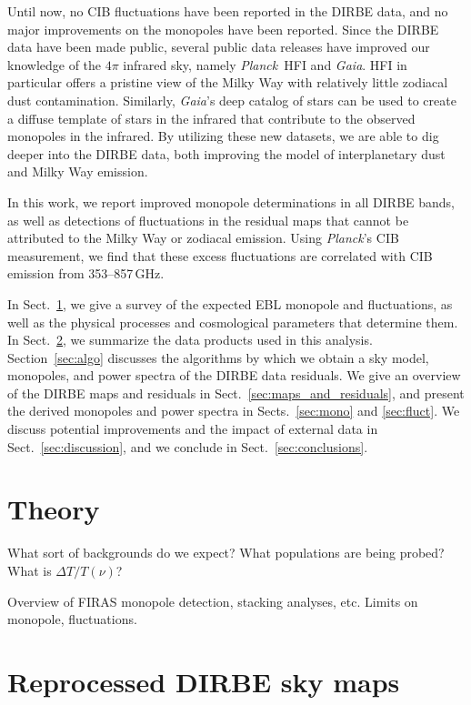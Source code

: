 \documentclass{aa}
\def\Planck{\textit{Planck}}
\begin{document}
Until now, no CIB fluctuations have been reported in the DIRBE data, and no major improvements on the monopoles have been reported. Since the DIRBE data have been made public, several public data releases have improved our knowledge of the $4\pi$ infrared sky, namely \Planck\ HFI and \textit{Gaia}. HFI in particular offers a pristine view of the Milky Way with relatively little zodiacal dust contamination. Similarly, \textit{Gaia}'s deep catalog of stars can be used to create a diffuse template of stars in the infrared that contribute to the observed monopoles in the infrared. By utilizing these new datasets, we are able to dig deeper into the DIRBE data, both improving the model of interplanetary dust and Milky Way emission.

In this work, we report improved monopole determinations in all DIRBE bands, as well as detections of fluctuations in the residual maps that cannot be attributed to the Milky Way or zodiacal emission. Using \Planck's CIB measurement, we find that these excess fluctuations are correlated with CIB emission from 353--857\,GHz.

In Sect.~\ref{sec:theory}, we give a survey of the expected EBL monopole and fluctuations, as well as the physical processes and cosmological parameters that determine them. In Sect.~\ref{sec:data}, we summarize the data products used in this analysis. Section~\ref{sec:algo} discusses the algorithms by which we obtain a sky model, monopoles, and power spectra of the DIRBE data residuals. We give an overview of the DIRBE maps and residuals in Sect.~\ref{sec:maps_and_residuals}, and present the derived monopoles and power spectra in Sects.~\ref{sec:mono} and \ref{sec:fluct}. We discuss potential improvements and the impact of external data in Sect.~\ref{sec:discussion}, and we conclude in Sect.~\ref{sec:conclusions}.



\section{Theory}
\label{sec:theory}

What sort of backgrounds do we expect? What populations are being probed? What is $\Delta T/T(\nu)$?

Overview of FIRAS monopole detection, stacking analyses, etc. Limits on monopole, fluctuations.

\section{Reprocessed DIRBE sky maps}
\label{sec:data}
\end{document}
